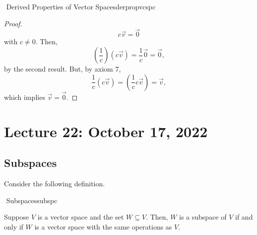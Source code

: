 \begin{theorem}{\Stop\,\,Derived Properties of Vector Spaces}{derpropvcspc}
\begin{enumerate}
\begin{proof}
                    \begin{equation*}
                        c\vec{v}=\vec{0}
                    \end{equation*}
                    with \(c\neq0\). Then,
                    \begin{equation*}
                        \left(\frac{1}{c}\right)(c\vec{v})=\frac{1}{c}\vec{0}=\vec{0},
                    \end{equation*}
                    by the second result. But, by axiom \(7\), 
                    \begin{equation*}
                        \frac{1}{c}(c\vec{v})=\left(\frac{1}{c}c\vec{v}\right)=\vec{v},
                    \end{equation*}
                    which implies \(\vec{v}=\vec{0}\).
                \end{proof}

            \end{enumerate}

        \end{theorem}

\pagebreak

\section{Lecture 22: October 17, 2022}

    \subsection{Subspaces}

        Consider the following definition.
        \begin{definition}{\Stop\,\,Subspaces}{subspc}

            Suppose \(V\) is a vector space and the set \(W\subseteq V\). Then, \(W\) is a subspace of \(V\) if and only if \(W\) is a vector space with the same operations as \(V\).
            
        \end{definition}